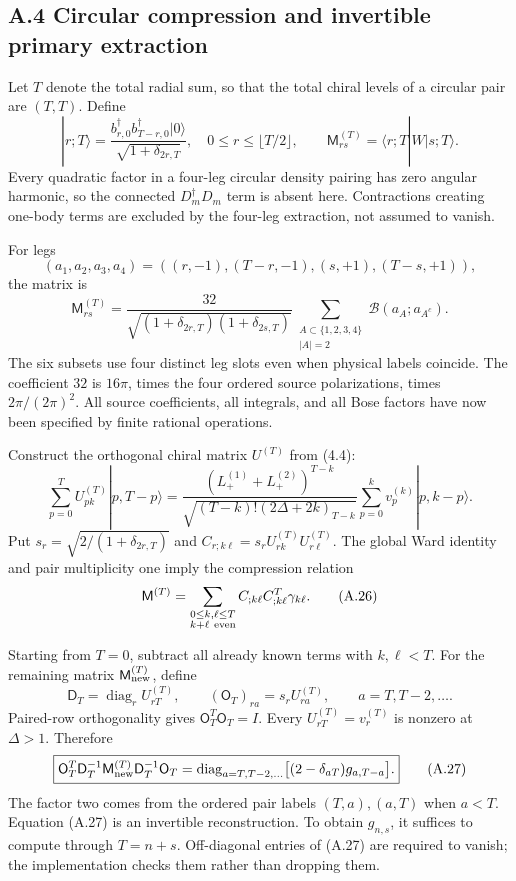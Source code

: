 \documentclass[a4paper,11pt]{article}
\numberwithin{equation}{section}
\begin{document}
\hypertarget{a.4-circular-compression-and-invertible-primary-extraction}{%
\subsection{A.4 Circular compression and invertible primary extraction}\label{a.4-circular-compression-and-invertible-primary-extraction}}

Let \(T\) denote the total radial sum, so that the total chiral levels of a circular pair are \((T,T)\). Define \[
|r;T\rangle=
\frac{b^\dagger_{r,0}b^\dagger_{T-r,0}|0\rangle}
{\sqrt{1+\delta_{2r,T}}},
\quad 0\le r\le\lfloor T/2\rfloor,
\qquad
\mathsf M^{(T)}_{rs}=\langle r;T|W|s;T\rangle.
\] Every quadratic factor in a four-leg circular density pairing has zero angular harmonic, so the connected \(D_m^\dagger D_m\) term is absent here. Contractions creating one-body terms are excluded by the four-leg extraction, not assumed to vanish.

For legs \[
(a_1,a_2,a_3,a_4)
=((r,-1),(T-r,-1),(s,+1),(T-s,+1)),
\] the matrix is \[
\boxed{
\mathsf M^{(T)}_{rs}
=\frac{32}{\sqrt{(1+\delta_{2r,T})(1+\delta_{2s,T})}}
\sum_{\substack{A\subset\{1,2,3,4\}\\|A|=2}}
\mathcal B(a_A;a_{A^c}).
}
\tag{A.24}
\] The six subsets use four distinct leg slots even when physical labels coincide. The coefficient \(32\) is \(16\pi\), times the four ordered source polarizations, times \(2\pi/(2\pi)^2\). All source coefficients, all integrals, and all Bose factors have now been specified by finite rational operations.

Construct the orthogonal chiral matrix \(U^{(T)}\) from (4.4): \[
\sum_{p=0}^T U^{(T)}_{pk}|p,T-p\rangle
=\frac{(L_+^{(1)}+L_+^{(2)})^{T-k}}
{\sqrt{(T-k)!(2\Delta+2k)_{T-k}}}
\sum_{p=0}^k v_p^{(k)}|p,k-p\rangle.
\tag{A.25}
\] Put \(s_r=\sqrt{2/(1+\delta_{2r,T})}\) and \(C_{r;k\ell}=s_rU^{(T)}_{rk}U^{(T)}_{r\ell}\). The global Ward identity and pair multiplicity one imply the compression relation \[
\mathsf M^{(T)}
=\sum_{\substack{0\le k,\ell\le T\\k+\ell\ {\rm even}}}
C_{;k\ell}C_{;k\ell}^{T}\gamma_{k\ell}.
\tag{A.26}
\]

Starting from \(T=0\), subtract all already known terms with \(k,\ell<T\). For the remaining matrix \(\mathsf M_{\rm new}^{(T)}\), define \[
\mathsf D_T=\operatorname{diag}_r U^{(T)}_{rT},
\qquad
(\mathsf O_T)_{ra}=s_rU^{(T)}_{ra},
\qquad a=T,T-2,\ldots .
\] Paired-row orthogonality gives \(\mathsf O_T^T\mathsf O_T=I\). Every \(U^{(T)}_{rT}=v_r^{(T)}\) is nonzero at \(\Delta>1\). Therefore \[
\boxed{
\mathsf O_T^T\mathsf D_T^{-1}\mathsf M_{\rm new}^{(T)}
\mathsf D_T^{-1}\mathsf O_T
=\operatorname{diag}_{a=T,T-2,\ldots}
\bigl[(2-\delta_{aT})g_{a,T-a}\bigr].
}
\tag{A.27}
\] The factor two comes from the ordered pair labels \((T,a),(a,T)\) when \(a<T\). Equation (A.27) is an invertible reconstruction. To obtain \(g_{n,s}\), it suffices to compute through \(T=n+s\). Off-diagonal entries of (A.27) are required to vanish; the implementation checks them rather than dropping them.
\end{document}
